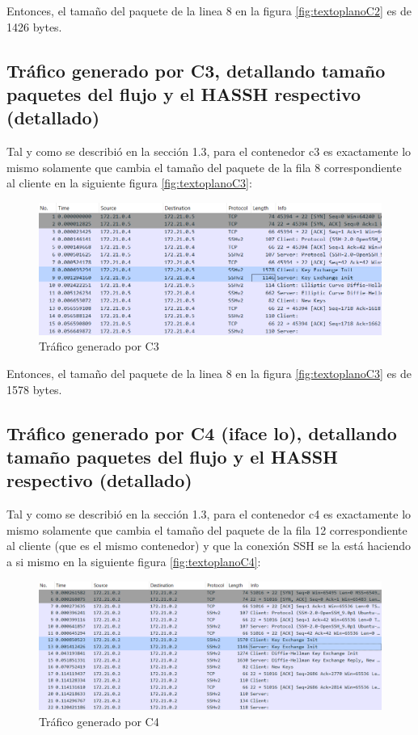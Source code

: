\documentclass[letter,12pt]{article}
\begin{document}
Entonces, el tamaño del paquete de la linea 8 en la figura \ref{fig:textoplanoC2} es de 1426 bytes.

\clearpage

\subsection{Tráfico generado por C3, detallando tamaño paquetes del flujo y el HASSH respectivo (detallado)}

Tal y como se describió en la sección 1.3, para el contenedor c3 es exactamente lo mismo solamente que cambia el tamaño del paquete de la fila 8 correspondiente al cliente en la siguiente figura \ref{fig:textoplanoC3}:


\begin{figure}[ht]
    \centering
    \includegraphics[width=1\linewidth]{Images/parte1/trafico_c3.png}
    \caption{Tráfico generado por C3}
    \label{fig:trafico_c3}
\end{figure}

Entonces, el tamaño del paquete de la linea 8 en la figura \ref{fig:textoplanoC3} es de 1578 bytes.

\clearpage

\subsection{Tráfico generado por C4 (iface lo), detallando tamaño paquetes del flujo y el HASSH respectivo (detallado)}

Tal y como se describió en la sección 1.3, para el contenedor c4 es exactamente lo mismo solamente que cambia el tamaño del paquete de la fila 12 correspondiente al cliente (que es el mismo contenedor) y que la conexión SSH se la está haciendo a si mismo en la siguiente figura \ref{fig:textoplanoC4}:



\begin{figure}[ht]
    \centering
    \includegraphics[width=1\linewidth]{Images/parte1/trafico_c4.png}
    \caption{Tráfico generado por C4}
    \label{fig:trafico_c4}
\end{figure}
\end{document}
